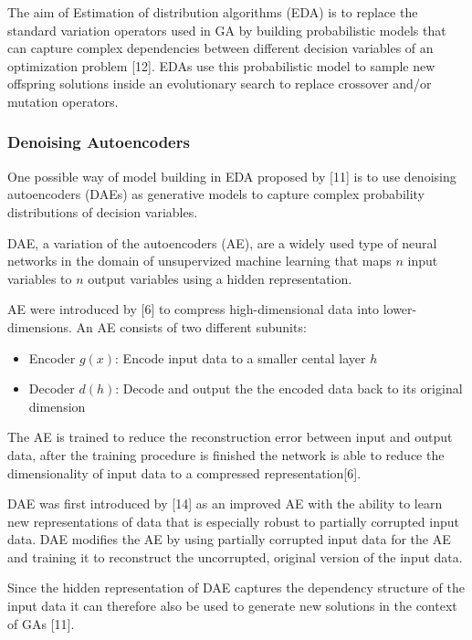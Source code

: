 \documentclass[
  11pt,
]{article}
\providecommand{\tightlist}{%
  \setlength{\itemsep}{0pt}\setlength{\parskip}{0pt}}
\begin{document}
The aim of Estimation of distribution algorithms (EDA) is to replace the
standard variation operators used in GA by building probabilistic models
that can capture complex dependencies between different decision
variables of an optimization problem {[}12{]}. EDAs use this
probabilistic model to sample new offspring solutions inside an
evolutionary search to replace crossover and/or mutation operators.

\hypertarget{denoising-autoencoders}{%
\subsubsection{Denoising Autoencoders}\label{denoising-autoencoders}}

One possible way of model building in EDA proposed by {[}11{]} is to use
denoising autoencoders (DAEs) as generative models to capture complex
probability distributions of decision variables.

DAE, a variation of the autoencoders (AE), are a widely used type of
neural networks in the domain of unsupervized machine learning that maps
\(n\) input variables to \(n\) output variables using a hidden
representation.

AE were introduced by {[}6{]} to compress high-dimensional data into
lower-dimensions. An AE consists of two different subunits:

\begin{itemize}
\tightlist
\item
  Encoder \(g(x)\): Encode input data to a smaller cental layer \(h\)
\item
  Decoder \(d(h)\): Decode and output the the encoded data back to its
  original dimension
\end{itemize}

The AE is trained to reduce the reconstruction error between input and
output data, after the training procedure is finished the network is
able to reduce the dimensionality of input data to a compressed
representation{[}6{]}.

DAE was first introduced by {[}14{]} as an improved AE with the ability
to learn new representations of data that is especially robust to
partially corrupted input data. DAE modifies the AE by using partially
corrupted input data for the AE and training it to reconstruct the
uncorrupted, original version of the input data.

Since the hidden representation of DAE captures the dependency structure
of the input data it can therefore also be used to generate new
solutions in the context of GAs {[}11{]}.
\end{document}
